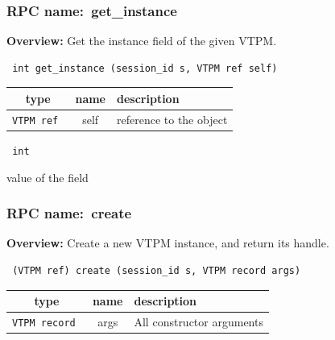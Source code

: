 \subsubsection{RPC name:~get\_instance}

{\bf Overview:} 
Get the instance field of the given VTPM.

\begin{verbatim} int get_instance (session_id s, VTPM ref self)\end{verbatim}



 
\vspace{0.3cm}
\begin{tabular}{|c|c|p{7cm}|}
 \hline
{\bf type} & {\bf name} & {\bf description} \\ \hline
{\tt VTPM ref } & self & reference to the object \\ \hline 

\end{tabular}

\vspace{0.3cm}

{\tt 
int
}


value of the field
\vspace{0.3cm}
\vspace{0.3cm}
\vspace{0.3cm}
\subsubsection{RPC name:~create}

{\bf Overview:} 
Create a new VTPM instance, and return its handle.

\begin{verbatim} (VTPM ref) create (session_id s, VTPM record args)\end{verbatim}



 
\vspace{0.3cm}
\begin{tabular}{|c|c|p{7cm}|}
 \hline
{\bf type} & {\bf name} & {\bf description} \\ \hline
{\tt VTPM record } & args & All constructor arguments \\ \hline 

\end{tabular}

\vspace{0.3cm}

